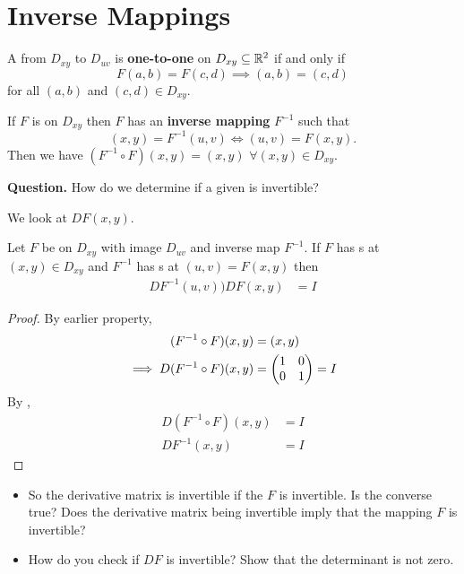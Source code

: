 \documentclass[english, 11pt]{article}
\begin{document}
\section{Inverse Mappings}

\begin{defn}\label{one-to-one}
A  from $D_{xy}$ to $D_{uv}$ is \textbf{one-to-one} on $D_{xy} \subseteq {\mathbb{R}}^2$ if and only if
\[ F(a,b) = F(c,d) \implies (a,b) = (c,d) \]
for all $(a,b)$ and $(c,d) \in D_{xy}$.
\end{defn}

\begin{thrm}
  If $F$ is  on $D_{xy}$ then $F$ has an \textbf{inverse mapping} $F^{-1}$ such that \[(x,y) = F^{-1}(u,v) \iff (u,v) = F(x,y).\]
  Then we have $(F^{-1} \circ F)(x,y) = (x,y)$ $\forall (x,y) \in D_{xy}$.
\end{thrm}

\textbf{Question.} How do we determine if a given  is invertible?

We look at $DF(x,y)$.

\begin{thrm}
  Let $F$ be  on $D_{xy}$ with image $D_{uv}$ and inverse map $F^{-1}$. If $F$ has  s at $(x,y) \in D_{xy}$ and $F^{-1}$ has  s at $(u,v) = F(x,y)$ then
  \begin{align*}
    DF^{-1}(u,v))DF(x,y) & = I
  \end{align*}
\end{thrm}

\begin{proof}
  By earlier property,
  \begin{align*}
    (F^{-1} \circ F)(x,y) & = (x,y) \\
    \implies D(F^{-1}\circ F)(x,y) & = \left( \begin{matrix} 1 & 0 \\  0 & 1 \end{matrix} \right) = I
  \end{align*}
  By ,
  \begin{align*}
    D(F^{-1}\circ F)(x,y) & = I \\
    DF^{-1}(x,y) & = I
  \end{align*}
\end{proof}

\begin{itemize}
  \item So the derivative matrix is invertible if the  $F$ is invertible. Is the converse true? Does the derivative matrix being invertible imply that the mapping $F$ is invertible?
  \item How do you check if $DF$ is invertible? Show that the determinant is not zero.
\end{itemize}
\end{document}
